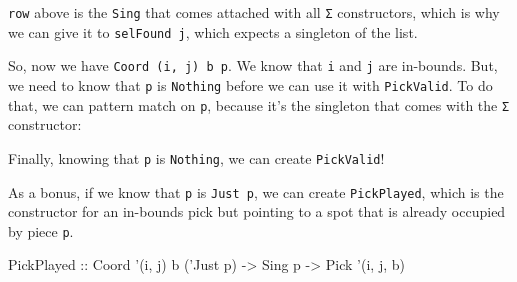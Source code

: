 \documentclass[]{article}
\newenvironment{Shaded}{}{}
\newcommand{\CommentTok}[1]{\textcolor[rgb]{0.38,0.63,0.69}{\textit{#1}}}
\newcommand{\DataTypeTok}[1]{\textcolor[rgb]{0.56,0.13,0.00}{#1}}
\newcommand{\FunctionTok}[1]{\textcolor[rgb]{0.02,0.16,0.49}{#1}}
\newcommand{\KeywordTok}[1]{\textcolor[rgb]{0.00,0.44,0.13}{\textbf{#1}}}
\newcommand{\NormalTok}[1]{#1}
\newcommand{\OtherTok}[1]{\textcolor[rgb]{0.00,0.44,0.13}{#1}}
\begin{document}
\texttt{row} above is the \texttt{Sing} that comes attached with all \texttt{Σ}
constructors, which is why we can give it to \texttt{selFound\ j}, which expects
a singleton of the list.

So, now we have \texttt{Coord\ \textquotesingle{}(i,\ j)\ b\ p}. We know that
\texttt{i} and \texttt{j} are in-bounds. But, we need to know that \texttt{p} is
\texttt{\textquotesingle{}Nothing} before we can use it with \texttt{PickValid}.
To do that, we can pattern match on \texttt{p}, because it's the singleton that
comes with the \texttt{Σ} constructor:

\begin{Shaded}
\end{Shaded}

Finally, knowing that \texttt{p} is \texttt{\textquotesingle{}Nothing}, we can
create \texttt{PickValid}!

As a bonus, if we know that \texttt{p} is \texttt{\textquotesingle{}Just\ p}, we
can create \texttt{PickPlayed}, which is the constructor for an in-bounds pick
but pointing to a spot that is already occupied by piece
\texttt{p\textquotesingle{}}.

\begin{Shaded}
\begin{Highlighting}[]
\DataTypeTok{PickPlayed}\OtherTok{ ::} \DataTypeTok{Coord}\NormalTok{ '(i, j) b ('}\DataTypeTok{Just}\NormalTok{ p)}
           \OtherTok{->} \DataTypeTok{Sing}\NormalTok{ p}
           \OtherTok{->} \DataTypeTok{Pick}\NormalTok{ '(i, j, b)}
\end{Highlighting}
\end{Shaded}
\end{document}
